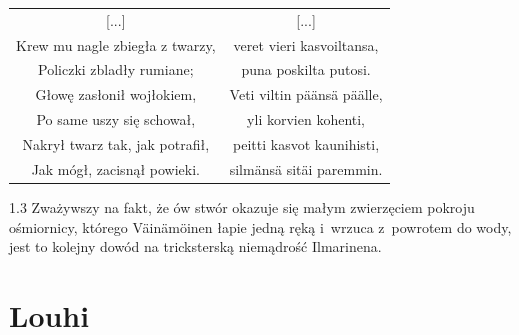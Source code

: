 \documentclass[11pt,a4paper,twoside]{report}
\begin{document}
{\centering
\small
\begin{longtable}{c c}
{[...]} & {[...]} \\
Krew mu nagle zbiegła z twarzy, & veret vieri kasvoiltansa, \\
Policzki zbladły rumiane; & puna poskilta putosi. \\
Głowę zasłonił wojłokiem, & Veti viltin päänsä päälle, \\
Po same uszy się schował, & yli korvien kohenti, \\
Nakrył twarz tak, jak potrafił, & peitti kasvot kaunihisti, \\
Jak mógł, zacisnął powieki. & silmänsä sitäi paremmin. \\
\end{longtable}
}
\begin{spacing}{1.3}
Zważywszy na fakt, że ów stwór okazuje się małym zwierzęciem pokroju ośmiornicy, którego Väinämöinen łapie jedną ręką i~wrzuca z~powrotem do wody, jest to kolejny dowód na tricksterską niemądrość Ilmarinena.
\end{spacing}
\newpage
\section{Louhi}
\vspace*{0.5\baselineskip}
\end{document}
